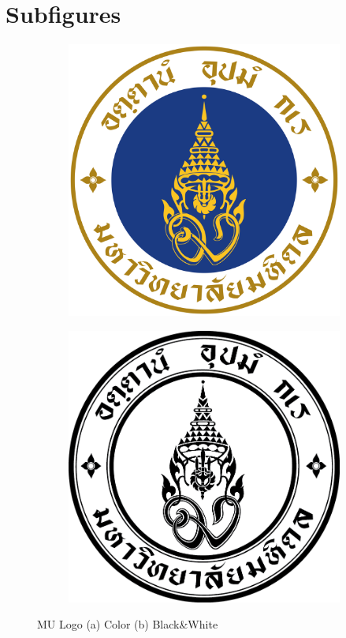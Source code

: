 \documentclass[11pt, a4paper]{article}
\begin{document}
	\section{Subfigures} 
	\begin{figure}[!h]
		\centering
		\begin{subfigure}[b]{0.35\linewidth}
			\includegraphics[width=\linewidth]{MU_LOGO_Color}
			\caption{}
		\end{subfigure}
		\hspace{1em}%
		\begin{subfigure}[b]{0.35\linewidth}
			\includegraphics[width=\linewidth]{MU_LOGO_BW}
			\caption{}
		\end{subfigure}
		\caption{MU Logo (a) Color (b) Black\&White}
		\label{fig:MU_Logo}
	\end{figure}
	
	\pagebreak
	\tableofcontents
	\pagebreak
	\listoffigures
	
	
\end{document}
